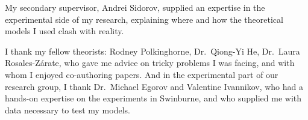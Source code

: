 My secondary supervisor, Andrei Sidorov, supplied an expertise in the experimental side of my research, explaining where and how the theoretical models I used clash with reality.

I thank my fellow theorists: Rodney Polkinghorne, Dr.~Qiong-Yi He, Dr.~Laura Rosales-Z\'arate, who gave me advice on tricky problems I was facing, and with whom I enjoyed co-authoring papers.
And in the experimental part of our research group, I thank Dr.~Michael Egorov and Valentine Ivannikov, who had a hands-on expertise on the  experiments in Swinburne, and who supplied me with data necessary to test my models.
